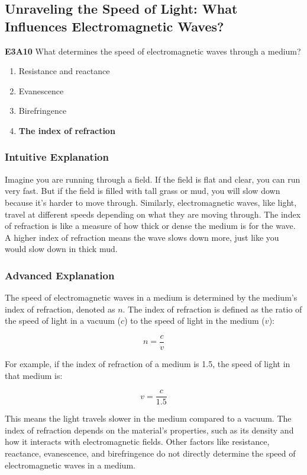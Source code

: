 \subsection{Unraveling the Speed of Light: What Influences Electromagnetic Waves?}

\begin{tcolorbox}[colback=gray!10!white,colframe=black!75!black,title=Multiple Choice Question]
    \textbf{E3A10} What determines the speed of electromagnetic waves through a medium?
    \begin{enumerate}[label=\Alph*.]
        \item Resistance and reactance
        \item Evanescence
        \item Birefringence
        \item \textbf{The index of refraction}
    \end{enumerate}
\end{tcolorbox}

\subsubsection{Intuitive Explanation}
Imagine you are running through a field. If the field is flat and clear, you can run very fast. But if the field is filled with tall grass or mud, you will slow down because it’s harder to move through. Similarly, electromagnetic waves, like light, travel at different speeds depending on what they are moving through. The index of refraction is like a measure of how thick or dense the medium is for the wave. A higher index of refraction means the wave slows down more, just like you would slow down in thick mud.

\subsubsection{Advanced Explanation}
The speed of electromagnetic waves in a medium is determined by the medium's index of refraction, denoted as \( n \). The index of refraction is defined as the ratio of the speed of light in a vacuum (\( c \)) to the speed of light in the medium (\( v \)):

\[
n = \frac{c}{v}
\]

For example, if the index of refraction of a medium is 1.5, the speed of light in that medium is:

\[
v = \frac{c}{1.5}
\]

This means the light travels slower in the medium compared to a vacuum. The index of refraction depends on the material's properties, such as its density and how it interacts with electromagnetic fields. Other factors like resistance, reactance, evanescence, and birefringence do not directly determine the speed of electromagnetic waves in a medium.

